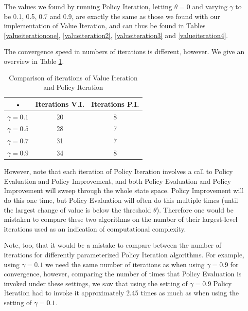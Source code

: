 \documentclass{article}
\begin{document}
The values we found by running Policy Iteration, letting $\theta = 0$ and varying $\gamma$ to be 0.1, 0.5, 0.7 and 0.9, are exactly the same as those we found with our implementation of Value Iteration, and can thus be found in Tables \ref{valueiterationone}, \ref{valueiteration2}, \ref{valueiteration3} and \ref{valueiteration4}.

The convergence speed in numbers of iterations is different, however. We give an overview in Table \ref{tab:policyEvaluationValues}.

\begin{table}[htb]
\centering
\begin{tabular}{|c|c|c|}
\hline 
• & Iterations V.I. & Iterations P.I. \\ 
\hline 
$\gamma = 0.1 $ & 20 & 8 \\ 
\hline 
$\gamma = 0.5 $ & 28 & 7 \\ 
\hline 
$\gamma = 0.7 $  & 31 & 7 \\ 
\hline 
$\gamma = 0.9 $ & 34 & 8 \\ 
\hline 
\end{tabular}
\caption{Comparison of iterations of Value Iteration and Policy Iteration}
\label{tab:policyEvaluationValues} 
\end{table}

However, note that each iteration of Policy Iteration involves a call to Policy Evaluation and Policy Improvement, and both Policy Evaluation and Policy Improvement will sweep through the whole state space. Policy Improvement will do this one time, but Policy Evaluation will often do this multiple times (until the largest change of value is below the threshold $\theta$). Therefore one would be mistaken to compare these two algorithms on the number of their largest-level iterations used as an indication of computational complexity. 

Note, too, that it would be a mistake to compare between the number of iterations for differently parameterized Policy Iteration algorithms. For example, using  $\gamma = 0.1 $ we need the same number of iterations as when using $\gamma = 0.9 $  for convergence, however, comparing the number of times that Policy Evaluation is invoked under these settings, we saw that using the setting of $\gamma = 0.9 $ Policy Iteration had to invoke it approximately 2.45 times as much as when using the setting of $\gamma = 0.1 $. 

\newpage
\appendix
\appendixpage
\end{document}
